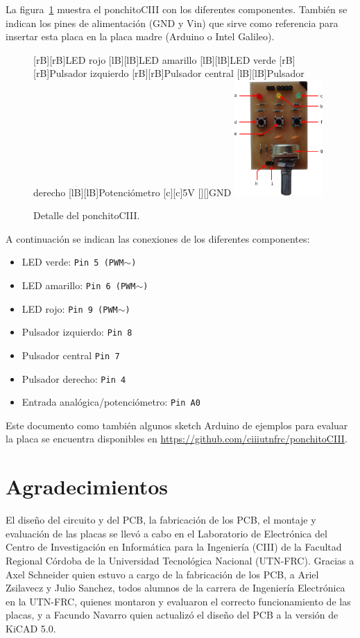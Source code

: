 \documentclass[a4paper]{article}
\begin{document}
La figura~\ref{fig:ponchito} muestra el ponchitoCIII con los diferentes componentes.
También se indican los pines de alimentación (GND y Vin) que sirve como referencia para insertar esta placa en la placa madre (Arduino o Intel Galileo).
\begin{figure}[hbt]
  \centering
  [rB][rB]{LED rojo}
  [lB][lB]{LED amarillo}
  [lB][lB]{LED verde}
  [rB][rB]{Pulsador izquierdo}
  [rB][rB]{Pulsador central}
  [lB][lB]{Pulsador derecho}
  [lB][lB]{Potenciómetro}
  [c][c]{5V}
  [][]{GND}
  \includegraphics[width=0.30\textwidth]{ponchito.eps}
  \caption{Detalle del ponchitoCIII.}
  \label{fig:ponchito}
\end{figure}

\bigskip
A continuación se indican las conexiones de los diferentes componentes:
\begin{itemize}
  \item  LED verde: \texttt{Pin 5 (PWM$\sim$)}
  \item  LED amarillo: \texttt{Pin 6 (PWM$\sim$)}
  \item  LED rojo: \texttt{Pin 9 (PWM$\sim$)}
  \item  Pulsador izquierdo: \texttt{Pin 8}
  \item  Pulsador central \texttt{Pin 7}
  \item  Pulsador derecho: \texttt{Pin 4}
  \item  Entrada analógica/potenciómetro: \texttt{Pin A0}
\end{itemize}

Este documento como también algunos sketch Arduino de ejemplos para evaluar la placa se encuentra disponibles en \href{https://github.com/ciiiutnfrc/ponchitoCIII}{https://github.com/ciiiutnfrc/ponchitoCIII}.

\section*{Agradecimientos}
El diseño del circuito y del PCB, la fabricación de los PCB, el montaje y evaluación de las placas se llevó a cabo en el Laboratorio de Electrónica del Centro de Investigación en Informática para la Ingeniería (CIII) de la Facultad Regional Córdoba de la Universidad Tecnológica Nacional (UTN-FRC).
Gracias a Axel Schneider quien estuvo a cargo de la fabricación de los PCB, a Ariel Zsilavecz y Julio Sanchez, todos alumnos de la carrera de Ingeniería Electrónica en la UTN-FRC, quienes montaron y evaluaron el correcto funcionamiento de las placas, y a Facundo Navarro quien actualizó el diseño del PCB a la versión de KiCAD 5.0.
\end{document}
